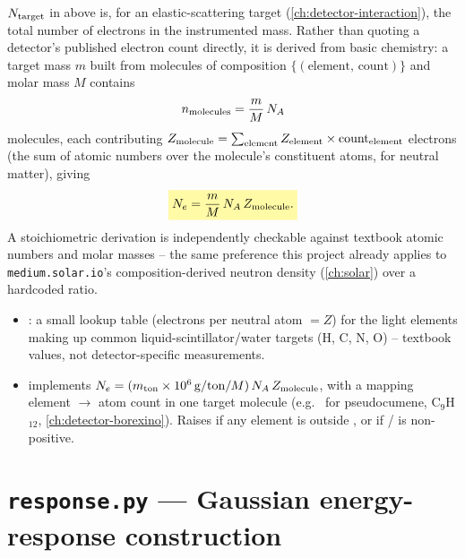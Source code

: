 \begin{theorybox}
$N_{\rm target}$ in  above is, for an
elastic-scattering target (\cref{ch:detector-interaction}), the total number
of electrons in the instrumented mass. Rather than quoting a detector's
published electron count directly, it is derived from basic chemistry: a
target mass $m$ built from molecules of composition
$\{(\text{element},\,\text{count})\}$ and molar mass $M$ contains
\begin{equation}
  n_{\rm molecules} = \frac{m}{M}\,N_A
\end{equation}
molecules, each contributing $Z_{\rm molecule}=\sum_{\rm element}
Z_{\rm element}\times{\rm count}_{\rm element}$ electrons (the sum of atomic
numbers over the molecule's constituent atoms, for neutral matter), giving
\begin{equation}
  \keyresult{N_e = \frac{m}{M}\,N_A\,Z_{\rm molecule}.}
\end{equation}
A stoichiometric derivation is independently checkable against textbook
atomic numbers and molar masses -- the same preference this project already
applies to \texttt{medium.solar.io}'s composition-derived neutron density
(\cref{ch:solar}) over a hardcoded ratio.
\end{theorybox}

\begin{implbox}
\begin{itemize}
  \item {}: a small lookup table (electrons per neutral
    atom $=Z$) for the light elements making up common
    liquid-scintillator/water targets (H, C, N, O) -- textbook values, not
    detector-specific measurements.
  \item {}
    implements $N_e=(m_{\rm ton}\times10^6\,{\rm g/ton}/M)\,N_A\,Z_{\rm molecule}$,
    with  a mapping element $\to$ atom count in one target
    molecule (e.g.\  for pseudocumene, C$_9$H$_{12}$,
    \cref{ch:detector-borexino}). Raises if any element is outside
    , or if /
    is non-positive.
\end{itemize}
\end{implbox}

\section{\texttt{response.py} --- Gaussian energy-response construction}
\label{sec:detector-response}

